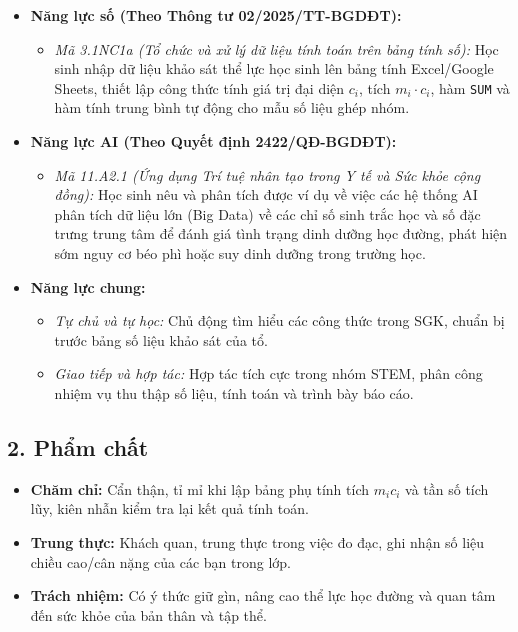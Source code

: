 \documentclass[12pt, a4paper]{article}
\begin{document}
\begin{itemize}[leftmargin=1.2cm]
    \item \textbf{Năng lực số (Theo Thông tư 02/2025/TT-BGDĐT):}
    \begin{itemize}[leftmargin=0.6cm]
        \item \textit{Mã 3.1NC1a (Tổ chức và xử lý dữ liệu tính toán trên bảng tính số):} Học sinh nhập dữ liệu khảo sát thể lực học sinh lên bảng tính Excel/Google Sheets, thiết lập công thức tính giá trị đại diện $c_i$, tích $m_i \cdot c_i$, hàm \texttt{SUM} và hàm tính trung bình tự động cho mẫu số liệu ghép nhóm.
    \end{itemize}

    \item \textbf{Năng lực AI (Theo Quyết định 2422/QĐ-BGDĐT):}
    \begin{itemize}[leftmargin=0.6cm]
        \item \textit{Mã 11.A2.1 (Ứng dụng Trí tuệ nhân tạo trong Y tế và Sức khỏe cộng đồng):} Học sinh nêu và phân tích được ví dụ về việc các hệ thống AI phân tích dữ liệu lớn (Big Data) về các chỉ số sinh trắc học và số đặc trưng trung tâm để đánh giá tình trạng dinh dưỡng học đường, phát hiện sớm nguy cơ béo phì hoặc suy dinh dưỡng trong trường học.
    \end{itemize}

    \item \textbf{Năng lực chung:}
    \begin{itemize}[leftmargin=0.6cm]
        \item \textit{Tự chủ và tự học:} Chủ động tìm hiểu các công thức trong SGK, chuẩn bị trước bảng số liệu khảo sát của tổ.
        \item \textit{Giao tiếp và hợp tác:} Hợp tác tích cực trong nhóm STEM, phân công nhiệm vụ thu thập số liệu, tính toán và trình bày báo cáo.
    \end{itemize}
\end{itemize}

\subsection*{2. Phẩm chất}

\begin{itemize}[leftmargin=1.2cm]
    \item \textbf{Chăm chỉ:} Cẩn thận, tỉ mỉ khi lập bảng phụ tính tích $m_i c_i$ và tần số tích lũy, kiên nhẫn kiểm tra lại kết quả tính toán.
    \item \textbf{Trung thực:} Khách quan, trung thực trong việc đo đạc, ghi nhận số liệu chiều cao/cân nặng của các bạn trong lớp.
    \item \textbf{Trách nhiệm:} Có ý thức giữ gìn, nâng cao thể lực học đường và quan tâm đến sức khỏe của bản thân và tập thể.
\end{itemize}
\end{document}
